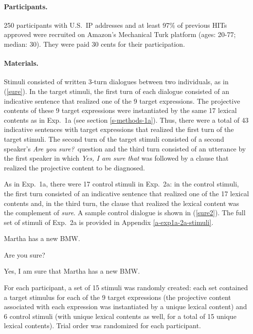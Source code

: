 \documentclass[11pt,fleqn]{article}
\newcommand{\6}{\mbox{$[\hspace*{-.6mm}[$}}
\newcommand{\9}{\mbox{$]\hspace*{-.6mm}]$}}
\begin{document}
\paragraph{Participants.} 250 participants with U.S.\ IP addresses and at least 97\% of previous HITs approved were recruited on Amazon's Mechanical Turk platform (ages: 20-77; median: 30). They were paid 30 cents for their participation.


\paragraph{Materials.} Stimuli consisted of written 3-turn dialogues between two individuals, as in (\ref{sure}). In the target stimuli, the first turn of each dialogue consisted of an indicative sentence that realized one of the 9 target expressions. The projective contents of these 9 target expressions were instantiated by the same 17 lexical contents as in Exp.~1a (see section \ref{s-methods-1a}). Thus, there were a total of 43 indicative sentences with target expressions that realized the first turn of the target stimuli. The second turn of the target stimuli consisted of a second speaker's {\em Are you sure?}~question and the third turn consisted of an utterance by the first speaker in which {\em Yes, I am sure that} was followed by a clause that realized the projective content to be diagnosed.

As in Exp.~1a, there were 17 control stimuli in Exp.~2a: in the control stimuli, the first turn consisted of an indicative sentence that realized one of the 17 lexical contents and, in the third turn, the clause that realized the lexical content was the complement of {\em sure}. A sample control dialogue is shown in (\ref{sure2}). The full set of stimuli of Exp.~2a is provided in Appendix \ref{a-exp1a-2a-stimuli}.


\begin{exe}
\ex\label{sure2}
\begin{xlist}
 Martha has a new BMW.

 Are you sure?

 Yes, I am sure that Martha has a new BMW.
\end{xlist}
\end{exe}

For each participant, a set of 15 stimuli was randomly created: each set contained a target stimulus for each of the 9 target expressions (the projective content associated with each expression was instantiated by a unique lexical content) and 6 control stimuli (with unique lexical contents as well, for a total of 15 unique lexical contents). Trial order was randomized for each participant.
\end{document}

